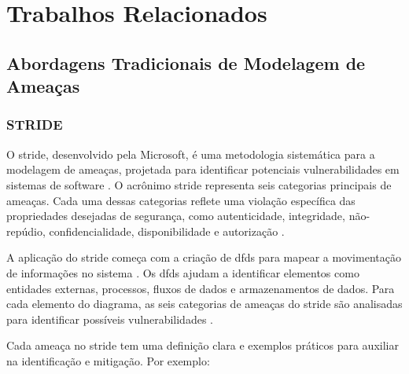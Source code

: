 
%

\chapter{Trabalhos Relacionados}
\label{cha:related_work}

\glsresetall

\section{Abordagens Tradicionais de Modelagem de Ameaças}
\label{sec:traditional_threat_modeling}

\subsection{STRIDE}
\label{subsec:stride}

O \gls{stride}, desenvolvido pela Microsoft, é uma metodologia sistemática
para a modelagem de ameaças, projetada para identificar potenciais
vulnerabilidades em sistemas de software \cite{MicrosoftThreatModelingTechnique}.
O acrônimo \gls{stride} representa seis categorias principais
de ameaças\cite{ThreatModelingdesigningForSecurity}.
Cada uma dessas categorias reflete uma violação específica das
propriedades desejadas de segurança, como autenticidade,
integridade, não-repúdio, confidencialidade, disponibilidade e autorização
\cite{MicrosoftThreatModelingTechnique}.

A aplicação do \gls{stride} começa com a criação de \gls{dfds}
para mapear a movimentação de informações no sistema
\cite{UncoverSecurityDesignFlawsSTRIDE}. Os \gls{dfds} ajudam a identificar
elementos como entidades externas, processos, fluxos de dados e
armazenamentos de dados. Para cada elemento do diagrama, as seis
categorias de ameaças do \gls{stride} são analisadas para identificar
possíveis vulnerabilidades \cite{ThreatModelingdesigningForSecurity}.

Cada ameaça no \gls{stride} tem uma definição clara e exemplos práticos para
auxiliar na identificação e mitigação. Por exemplo:

